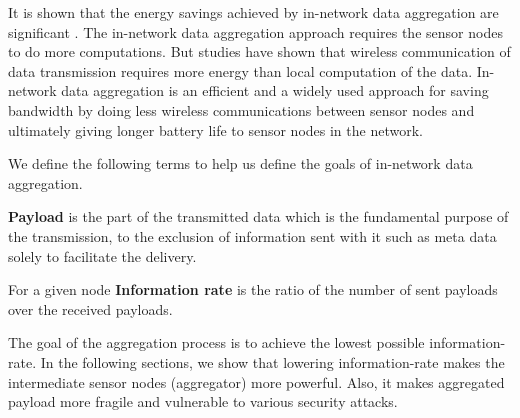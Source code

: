 	It is shown that the energy savings achieved by in-network data aggregation are significant \cite{madden2002tag}.
	The in-network data aggregation approach requires the sensor nodes to do more computations.
	But studies have shown that wireless communication of data transmission requires more energy than local computation of the data. 
	In-network data aggregation is an efficient and a widely used approach for saving bandwidth by doing less wireless communications between sensor nodes and ultimately giving longer battery life to sensor nodes in the network.

	We define the following terms to help us define the goals of in-network data aggregation.
	\begin{definition}\label{def:payload}\cite{PayloadWiKi}
		\textbf{Payload} is the part of the transmitted data which is the fundamental purpose of the transmission, to the exclusion of information sent with it such as meta data solely to facilitate the delivery.
	\end{definition}
	\begin{definition}\label{def:information-rate}
		For a given node \textbf {Information rate} is the ratio of the number of sent payloads over the received payloads.
	\end{definition}
	The goal of the aggregation process is to achieve the lowest possible information-rate.
	In the following sections, we show that lowering information-rate makes the intermediate sensor nodes (aggregator) more powerful.
	Also, it makes aggregated payload more fragile and vulnerable to various security attacks.

